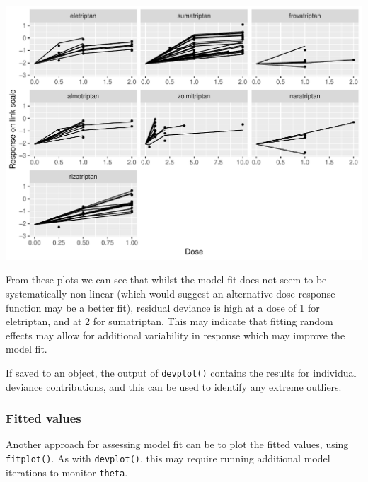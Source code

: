 \documentclass[]{article}
\newenvironment{Shaded}{\begin{snugshade}}{\end{snugshade}}
\newcommand{\CommentTok}[1]{\textcolor[rgb]{0.56,0.35,0.01}{\textit{#1}}}
\newcommand{\KeywordTok}[1]{\textcolor[rgb]{0.13,0.29,0.53}{\textbf{#1}}}
\newcommand{\NormalTok}[1]{#1}
\begin{document}
\includegraphics{mbnmadose_files/figure-latex/unnamed-chunk-35-1.pdf}

From these plots we can see that whilst the model fit does not seem to
be systematically non-linear (which would suggest an alternative
dose-response function may be a better fit), residual deviance is high
at a dose of 1 for eletriptan, and at 2 for sumatriptan. This may
indicate that fitting random effects may allow for additional
variability in response which may improve the model fit.

If saved to an object, the output of \texttt{devplot()} contains the
results for individual deviance contributions, and this can be used to
identify any extreme outliers.

\hypertarget{fitted-values}{%
\subsubsection{Fitted values}\label{fitted-values}}

Another approach for assessing model fit can be to plot the fitted
values, using \texttt{fitplot()}. As with \texttt{devplot()}, this may
require running additional model iterations to monitor \texttt{theta}.

\begin{Shaded}
\end{Shaded}
\end{document}
